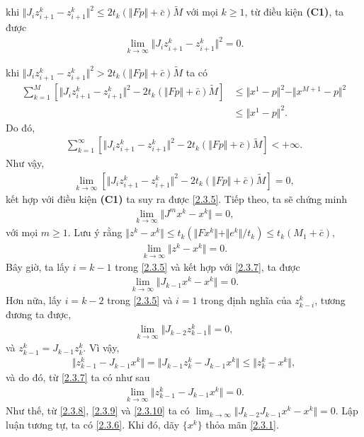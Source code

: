 \documentclass[14pt, oneside,A4paper]{book}
\theoremstyle{plain}
\begin{document}
 khi $\Vert J_{i}z_{i+1}^{k}-z_{i+1}^{k}\Vert^{2} \leq 2t_{k}(\Vert Fp\Vert+\bar{c})\tilde{M}$ với mọi $k \geq 1$, từ điều kiện {\bf (C1)}, ta được
\begin{align} \label{2.3.5}
\lim_{k \rightarrow \infty} \Vert J_{i}z_{i+1}^{k}-z_{i+1}^{k} \Vert^{2}=0.
\end{align}

 khi $\Vert J_{i}z_{i+1}^{k}-z_{i+1}^{k}\Vert^{2} > 2t_{k}(\Vert Fp\Vert+\bar{c})\tilde{M}$ ta có
\begin{align*}
\sum_{k=1}^{M}[\Vert J_{i}z_{i+1}^{k}-z_{i+1}^{k}\Vert^{2}-2t_{k}(\Vert Fp \Vert+\bar{c})\tilde{M}]&\leq \Vert x^{1}-p \Vert^{2}-\Vert x^{M+1}-p \Vert^{2} \\
&\leq \Vert x^{1}-p \Vert^{2}.
\end{align*}
Do đó,
\begin{align*}
\sum_{k=1}^{\infty}[\Vert J_{i}z_{i+1}^{k}-z_{i+1}^{k}\Vert^{2}-2t_{k}(\Vert Fp \Vert+\bar{c})\tilde{M}]< +\infty.
\end{align*}
Như vậy,
\begin{align*}
\lim_{k \rightarrow \infty}[\Vert J_{i}z_{i+1}^{k}-z_{i+1}^{k} \Vert^{2}-2t_{k}(\Vert Fp \Vert+\bar{c})\tilde{M}]=0,
\end{align*}
kết hợp với điều kiện {\bf (C1)} ta suy ra được \eqref{2.3.5}. Tiếp theo, ta sẽ chứng minh
\begin{align} \label{2.3.6}
\lim_{k \rightarrow \infty} \Vert J^{m}x^{k}-x^{k}\Vert=0, 
\end{align}
với mọi $m\geq 1$. Lưu ý rằng $\Vert z^{k}-x^{k}\Vert \leq t_{k}(\Vert Fx^{k}\Vert+\Vert e^{k}\Vert/t_{k})\leq t_{k}(M_{1}+\bar{c}),$
\begin{align} \label{2.3.7}
\lim_{k \rightarrow \infty}\Vert z^{k}-x^{k} \Vert=0.
\end{align}
Bây giờ, ta lấy $i=k-1$ trong \eqref{2.3.5} và kết hợp với \eqref{2.3.7}, ta được
\begin{align}\label{2.3.8}
\lim_{k \rightarrow \infty}\Vert J_{k-1}x^{k}-x^{k}\Vert=0.
\end{align}
Hơn nữa, lấy $i=k-2$ trong \eqref{2.3.5} và $i=1$ trong định nghĩa của $z_{k-i}^{k}$, tương đương ta được,
\begin{align}\label{2.3.9}
\lim_{k \rightarrow \infty} \Vert J_{k-2}z_{k-1}^{k} \Vert =0,
\end{align}
và $z_{k-1}^{k}=J_{k-1}z_{k}^{k}$. Vì vậy,
\begin{align*}
\Vert z_{k-1}^{k}-J_{k-1}x^{k}\Vert = \Vert J_{k-1}z_{k}^{k}-J_{k-1}x^{k}\Vert \leq \Vert z_{k}^{k}-x^{k}\Vert,
\end{align*}
và do đó, từ \eqref{2.3.7} ta có như sau
\begin{align} \label{2.3.10}
\lim_{k\rightarrow\infty}\Vert z_{k-1}^{k}-J_{k-1}x^{k}\Vert=0.
\end{align}
Như thế, từ \eqref{2.3.8}, \eqref{2.3.9} và \eqref{2.3.10} ta có $\lim_{k\rightarrow\infty}\Vert J_{k-2}J_{k-1}x^{k}-x^{k}\Vert=0$. Lập luận tương tự, ta có \eqref{2.3.6}. Khi đó, dãy $\lbrace x^{k} \rbrace$ thỏa mãn \eqref{2.3.1}.
\end{document}

